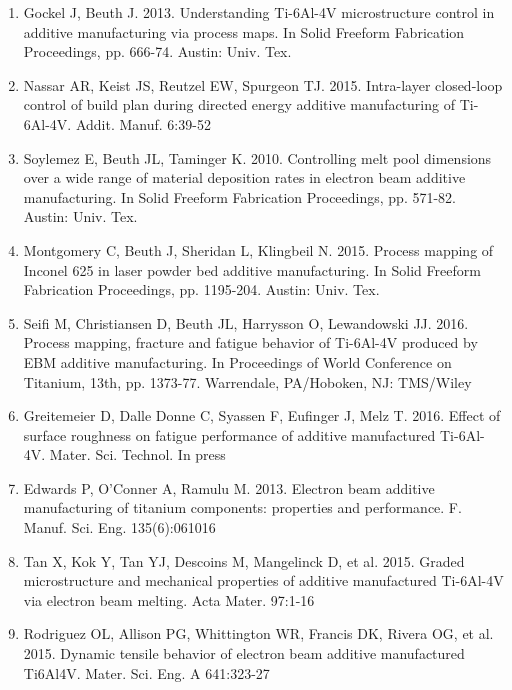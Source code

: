 \documentclass[10pt]{article}
\begin{document}
\begin{enumerate}
  \item Gockel J, Beuth J. 2013. Understanding Ti-6Al-4V microstructure control in additive manufacturing via process maps. In Solid Freeform Fabrication Proceedings, pp. 666-74. Austin: Univ. Tex.

  \item Nassar AR, Keist JS, Reutzel EW, Spurgeon TJ. 2015. Intra-layer closed-loop control of build plan during directed energy additive manufacturing of Ti-6Al-4V. Addit. Manuf. 6:39-52

  \item Soylemez E, Beuth JL, Taminger K. 2010. Controlling melt pool dimensions over a wide range of material deposition rates in electron beam additive manufacturing. In Solid Freeform Fabrication Proceedings, pp. 571-82. Austin: Univ. Tex.

  \item Montgomery C, Beuth J, Sheridan L, Klingbeil N. 2015. Process mapping of Inconel 625 in laser powder bed additive manufacturing. In Solid Freeform Fabrication Proceedings, pp. 1195-204. Austin: Univ. Tex.

  \item Seifi M, Christiansen D, Beuth JL, Harrysson O, Lewandowski JJ. 2016. Process mapping, fracture and fatigue behavior of Ti-6Al-4V produced by EBM additive manufacturing. In Proceedings of World Conference on Titanium, 13th, pp. 1373-77. Warrendale, PA/Hoboken, NJ: TMS/Wiley

  \item Greitemeier D, Dalle Donne C, Syassen F, Eufinger J, Melz T. 2016. Effect of surface roughness on fatigue performance of additive manufactured Ti-6Al-4V. Mater. Sci. Technol. In press

  \item Edwards P, O'Conner A, Ramulu M. 2013. Electron beam additive manufacturing of titanium components: properties and performance. F. Manuf. Sci. Eng. 135(6):061016

  \item Tan X, Kok Y, Tan YJ, Descoins M, Mangelinck D, et al. 2015. Graded microstructure and mechanical properties of additive manufactured Ti-6Al-4V via electron beam melting. Acta Mater. 97:1-16

  \item Rodriguez OL, Allison PG, Whittington WR, Francis DK, Rivera OG, et al. 2015. Dynamic tensile behavior of electron beam additive manufactured Ti6Al4V. Mater. Sci. Eng. A 641:323-27


\end{enumerate}
\end{document}
